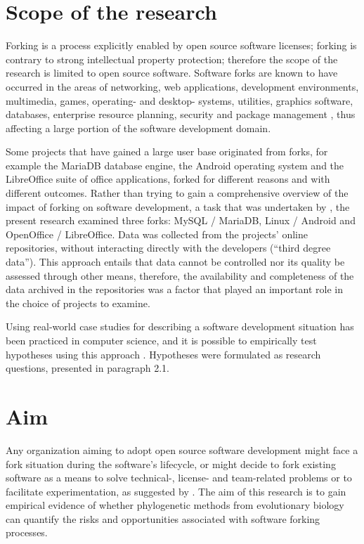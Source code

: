 
\section{Scope of the research}

Forking is a process explicitly enabled by open source software licenses; forking is contrary to strong intellectual property protection; therefore the scope of the research is limited to open source software. Software forks are known to have occurred in the areas of networking, web applications, development environments, multimedia, games, operating- and desktop- systems, utilities, graphics software, databases, enterprise resource planning, security and package management \citep{Robles2012a}, thus affecting a large portion of the software development domain.

Some projects that have gained a large user base originated from forks, for example the MariaDB database engine, the Android operating system and the LibreOffice suite of office applications, forked for different reasons and with different outcomes. Rather than trying to gain a comprehensive overview of the impact of forking on software development, a task that was undertaken by \citet{Robles2012a}, the present research examined three forks: MySQL / MariaDB, Linux / Android and OpenOffice / LibreOffice. Data was collected from the projects' online repositories, without interacting directly with the developers (“third degree data”). This approach entails that data cannot be controlled nor its quality be assessed through other means, therefore, the availability and completeness of the data archived in the repositories was a factor that played an important role in the choice of projects to examine.

Using real-world case studies for describing a software development situation has been practiced in computer science, and it is possible to empirically test hypotheses using this approach \citep{Runeson2009b}. Hypotheses were formulated as research questions, presented in paragraph 2.1.


\section{Aim}
Any organization aiming to adopt open source software development might face a fork situation during the software's lifecycle, or might decide to fork existing software as a means to solve technical-, license- and team-related problems or to facilitate experimentation, as suggested by \citet{Robles2012a}. The aim of this research is to gain empirical evidence of whether phylogenetic methods from evolutionary biology can quantify the risks and opportunities associated with software forking processes.

